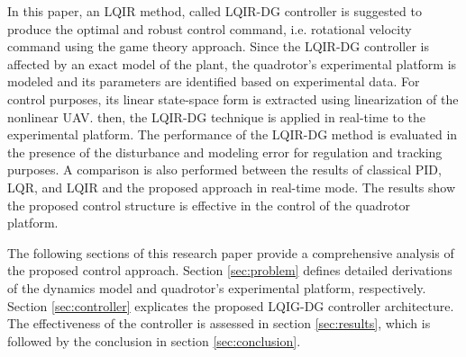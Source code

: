 \documentclass[3p,times]{elsarticle}
\begin{document}
In this paper, an LQIR method, called LQIR-DG controller is suggested to produce the optimal and robust control command, i.e. rotational velocity command using the game theory approach.
Since the LQIR-DG controller is affected by an exact model of the plant, the quadrotor's experimental platform is modeled and its parameters are identified based on experimental data. 
For control purposes, its linear state-space form is extracted using linearization of the nonlinear UAV.
then, the LQIR-DG technique is applied in real-time to the experimental platform.
The performance of the LQIR-DG method is evaluated in the presence of the disturbance and modeling error for regulation and tracking purposes.
A comparison is also performed between the results of classical PID, LQR, and LQIR and the proposed approach in real-time mode.
The results show the proposed control structure is effective in the control of the quadrotor platform.



The following sections of this research paper provide a comprehensive analysis of the proposed control approach. Section \ref{sec:problem} defines detailed derivations of the dynamics model and quadrotor's experimental platform, respectively. Section \ref{sec:controller} explicates the proposed LQIG-DG controller architecture. The effectiveness of the controller is assessed in section \ref{sec:results}, which is followed by the conclusion in section \ref{sec:conclusion}.
\end{document}

